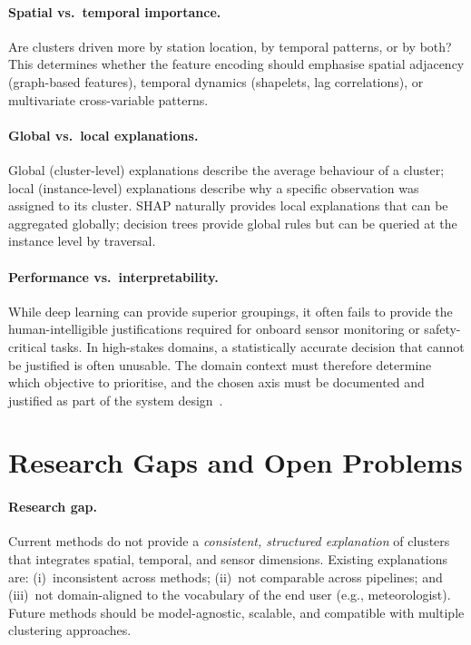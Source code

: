 \documentclass{article}
\theoremstyle{plain}
\theoremstyle{definition}
\theoremstyle{remark}
\begin{document}
\paragraph{Spatial vs.\ temporal importance.}
Are clusters driven more by station location, by temporal patterns, or
by both? This determines whether the feature encoding should emphasise
spatial adjacency (graph-based features), temporal dynamics (shapelets,
lag correlations), or multivariate cross-variable patterns.

\paragraph{Global vs.\ local explanations.}
Global (cluster-level) explanations describe the average behaviour of a
cluster; local (instance-level) explanations describe why a specific
observation was assigned to its cluster. SHAP naturally provides local
explanations that can be aggregated globally; decision trees provide
global rules but can be queried at the instance level by traversal.

\paragraph{Performance vs.\ interpretability.}
While deep learning can provide superior groupings, it often fails to
provide the human-intelligible justifications required for onboard sensor
monitoring or safety-critical tasks. In high-stakes domains, a
statistically accurate decision that cannot be justified is often
unusable. The domain context must therefore determine which objective to
prioritise, and the chosen axis must be documented and justified as part
of the system design~\cite{schlegel_towards_2025}.

\section{Research Gaps and Open Problems}
\label{sec:gaps}

\paragraph{Research gap.}
Current methods do not provide a \emph{consistent, structured explanation}
of clusters that integrates spatial, temporal, and sensor dimensions.
Existing explanations are: (i)~inconsistent across methods; (ii)~not
comparable across pipelines; and (iii)~not domain-aligned to the
vocabulary of the end user (e.g., meteorologist). Future methods should
be model-agnostic, scalable, and compatible with multiple clustering
approaches.
\end{document}
